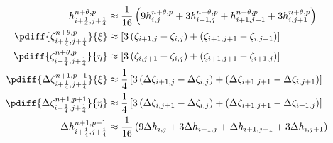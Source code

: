\begin{align}
    h^{n+\theta, p}_{i+\quart, j+\quart} & \approx
    \frac{1}{16}\left( 9h^{n+\theta, p}_{i, j} + 3 h^{n+\theta, p}_{i+1,j} + h^{n+\theta, p}_{i+1, j+1} + 3  h^{n+\theta, p}_{i, j+1}\right)
    \\*
    \pdiff{\zeta^{n+\theta, p}_{i+\quart, j+\quart}}{\xi} & \approx
   \left[ 3 \left(\zeta_{i+1,j} - \zeta_{i,j}\right) + \left( \zeta_{i+1,j+1} - \zeta_{i,j+1}\right) \right]
   \\*
\pdiff{\zeta^{n+\theta, p}_{i+\quart, j+\quart}}{\eta} & \approx
\left[ 3 \left(\zeta_{i,j+1} - \zeta_{i,j}\right) + \left( \zeta_{i+1,j+1} - \zeta_{i+1,j}\right) \right]
\\*
   \pdiff{\Delta \zeta^{n+1, p+1}_{i+\quart, j+\quart}}{\xi} & \approx
   \quart\left[ 3 \left(\Delta\zeta_{i+1,j} - \Delta\zeta_{i,j}\right) + \left(\Delta\zeta_{i+1,j+1} - \Delta\zeta_{i,j+1} \right) \right]
\\*
   \pdiff{\Delta \zeta^{n+1, p+1}_{i+\quart, j+\quart}}{\eta} & \approx
\quart\left[ 3 \left(\Delta\zeta_{i,j+1} - \Delta\zeta_{i,j}\right) + \left(\Delta\zeta_{i+1,j+1} - \Delta\zeta_{i+1,j} \right) \right]
\\*
   \Delta h^{n+1,p+1}_{i+\quart, j+\quart} & \approx
   \frac{1}{16}\left( 9\Delta h_{i, j} + 3 \Delta h_{i+1,j} + \Delta h_{i+1, j+1} + 3  \Delta h_{i, j+1}\right)
\end{align}
%

